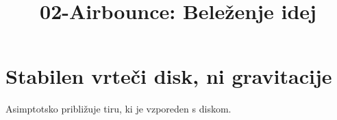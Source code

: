 \documentclass[11pt,a4paper]{article}
\title{02-Airbounce: Beleženje idej}
\date{}
\begin{document}
\maketitle

\section{Stabilen vrteči disk, ni gravitacije}
Asimptotsko približuje tiru, ki je vzporeden s diskom.
\end{document}
